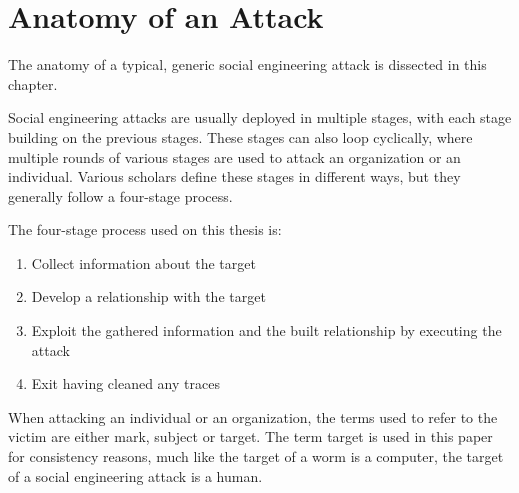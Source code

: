 



\chapter{Anatomy of an Attack\label{chapter:anatomy}}
\begin{comment}

Guides:
    - About 2 pages

TODO:
    [ ] Cover how SE attacks are cyclical

What to cover:
    - The 4-Stage process of SE
        - Gather OSINT
        - Build relationship
        - Exploit relationship / launch the attack
        - Exit / cover traces
    - Cyclical nature of SE attacks
    
Literature:
    - 

\end{comment}

The anatomy of a typical, generic social engineering attack is dissected in this chapter.

Social engineering attacks are usually deployed in multiple stages, with each stage building on the previous stages. These stages can also loop cyclically, where multiple rounds of various stages are used to attack an organization or an individual. Various scholars define these stages in different ways, but they generally follow a four-stage process.

The four-stage process used on this thesis is:

\begin{enumerate}
    \item Collect information about the target
    \item Develop a relationship with the target
    \item Exploit the gathered information and the built relationship by executing the attack
    \item Exit having cleaned any traces
\end{enumerate}

When attacking an individual or an organization, the terms used to refer to the victim are either mark, subject or target. The term target is used in this paper for consistency reasons, much like the target of a worm is a computer, the target of a social engineering attack is a human.

